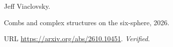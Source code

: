 Jeff Viaclovsky.

\newblock Combs and complex structures on the six-sphere, 2026{}.

\newblock URL \url{https://arxiv.org/abs/2610.10451}.
\newblock \emph{Verified}.

